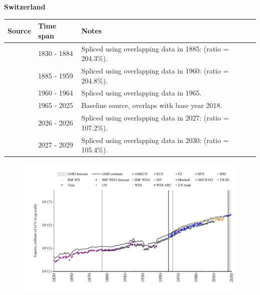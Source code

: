 \documentclass[12pt,a4paper,landscape]{article}
\begin{document}
\begin{adjustbox}{max totalsize={\paperwidth}{\paperheight},center}
\begin{minipage}[t][\textheight][t]{\textwidth}
\vspace*{0.5cm}
{}
\begin{center}
{\Large\bfseries Switzerland}
\end{center}
\vspace{0.5cm}
\begin{table}[H]
\centering
\small
\begin{tabular}{|l|l|l|}
\hline
\textbf{Source} & \textbf{Time span} & \textbf{Notes} \\
\hline
\rowcolor{white}\cite{Tena}& 1830 - 1884 &Spliced using overlapping data in 1885: (ratio = 204.3\%).\\
\rowcolor{lightgray}\cite{JST}& 1885 - 1959 &Spliced using overlapping data in 1960: (ratio = 204.8\%).\\
\rowcolor{white}\cite{AMECO}& 1960 - 1964 &Spliced using overlapping data in 1965.\\
\rowcolor{lightgray}\cite{OECD_EO}& 1965 - 2025 &Baseline source, overlaps with base year 2018.\\
\rowcolor{white}\cite{AMECO}& 2026 - 2026 &Spliced using overlapping data in 2027: (ratio = 107.2\%).\\
\rowcolor{lightgray}\cite{IMF_WEO_forecast}& 2027 - 2029 &Spliced using overlapping data in 2030: (ratio = 105.4\%).\\
\hline
\end{tabular}
\end{table}
\begin{figure}[H]
\centering
\includegraphics[width=\textwidth,height=0.6\textheight,keepaspectratio]{graphs/CHE_exports.pdf}
\end{figure}
\end{minipage}
\end{adjustbox}
\end{document}

